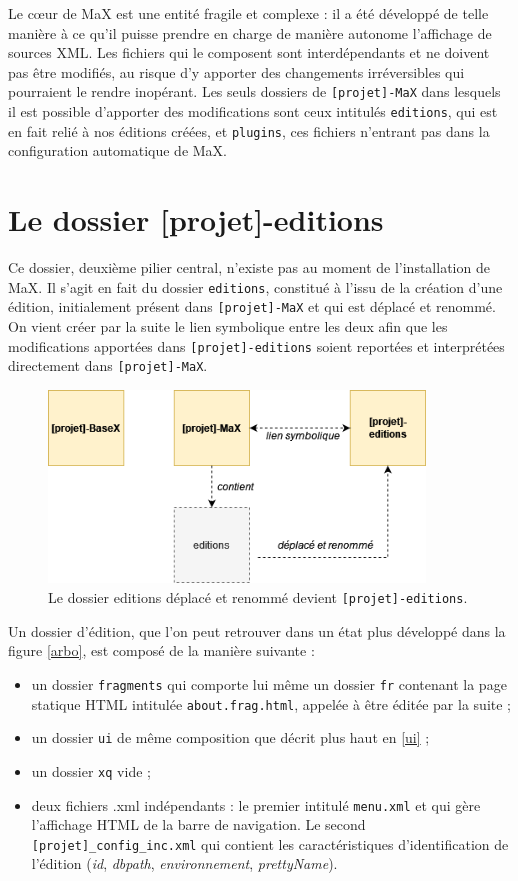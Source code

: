 \documentclass[a4paper,12pt,twoside]{book}
\begin{document}
Le c\oe{}ur de MaX est une entité fragile et complexe : il a été développé de telle manière à ce qu'il puisse prendre en charge de manière autonome l'affichage de sources XML. Les fichiers qui le composent sont interdépendants et ne doivent pas être modifiés, au risque d'y apporter des changements irréversibles qui pourraient le rendre inopérant. Les seuls dossiers de \texttt{[projet]-MaX} dans lesquels il est possible d'apporter des modifications sont ceux intitulés \texttt{editions}, qui est en fait relié à nos éditions créées, et  \texttt{plugins}, ces fichiers n'entrant pas dans la configuration automatique de MaX.

\section{Le dossier [projet]-editions}
Ce dossier, deuxième pilier central, n'existe pas au moment de l'installation de MaX. Il s'agit en fait du dossier \texttt{editions}, constitué à l'issu de la création d'une édition, initialement présent dans \texttt{[projet]-MaX} et qui est déplacé et renommé. On vient créer par la suite le lien symbolique entre les deux afin que les modifications apportées dans \texttt{[projet]-editions} soient reportées et interprétées directement dans \texttt{[projet]-MaX}.

\begin{figure}[H]
    \centering
    \includegraphics[width=10cm]{img/partie_2/editions.png}
    \caption{Le dossier editions déplacé et renommé devient \texttt{[projet]-editions}.}
\end{figure}

Un dossier d'édition, que l'on peut retrouver dans un état plus développé dans la figure \ref{arbo}, est composé de la manière suivante :
\begin{itemize}
    \item un dossier \texttt{fragments} qui comporte lui même un dossier \texttt{fr} contenant la page statique \acrshort{HTML} intitulée \texttt{about.frag.html}, appelée à être éditée par la suite ;
    \item un dossier \texttt{ui} de même composition que décrit plus haut en \ref{ui} ;
    \item un dossier \texttt{xq} vide ;
    \item deux fichiers .xml indépendants : le premier intitulé \texttt{menu.xml} et qui gère l'affichage \acrshort{HTML} de la barre de navigation. Le second   \texttt{[projet]\_config\_inc.xml} qui contient les caractéristiques d'identification de l'édition (\textit{id}, \textit{dbpath}, \textit{environnement}, \textit{prettyName}).
\end{itemize}
\end{document}

